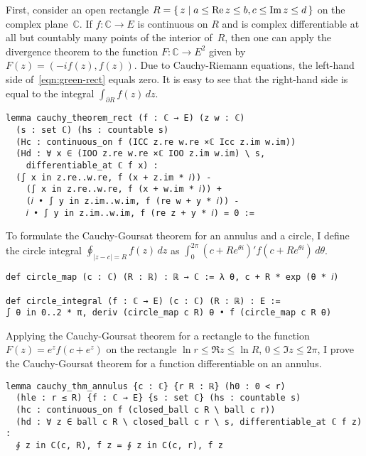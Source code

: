 \documentclass[a4paper, UKenglish,cleveref, autoref, thm-restate]{lipics-v2021}
\newcommand{\bbC}{\mathbb{C}}
\begin{document}
First, consider an open rectangle
\(R=\set{z|a\le \operatorname{Re}z\le b,c\le \operatorname{Im}z\le d}\) on the complex
plane~\(\bbC\). If \(f\colon \bbC\to E\) is continuous on \(R\) and is
complex differentiable at all but countably many points of the
interior of~\(R\), then one can apply the divergence theorem to the
function \(F\colon \bbC \to E^{2}\) given by \(F(z)=(-if(z),
f(z))\). Due to Cauchy-Riemann equations, the left-hand side
of~\eqref{eqn:green-rect} equals zero. It is easy to see that the
right-hand side is equal to the integral
\(\int_{\partial R}f(z)\,dz\).

\begin{lstlisting}[caption={The Cauchy-Goursat theorem for a rectangle},label=lst:cauchy-rect]
lemma cauchy_theorem_rect (f : ℂ → E) (z w : ℂ)
  (s : set ℂ) (hs : countable s)
  (Hc : continuous_on f (ICC z.re w.re ×ℂ Icc z.im w.im))
  (Hd : ∀ x ∈ (IOO z.re w.re ×ℂ IOO z.im w.im) \ s,
    differentiable_at ℂ f x) :
  (∫ x in z.re..w.re, f (x + z.im * 𝑖)) -
    (∫ x in z.re..w.re, f (x + w.im * 𝑖)) +
    (𝑖 • ∫ y in z.im..w.im, f (re w + y * 𝑖)) -
    𝑖 • ∫ y in z.im..w.im, f (re z + y * 𝑖) = 0 :=
\end{lstlisting}

To formulate the Cauchy-Goursat theorem for an annulus and a circle, I
define the circle integral \(\oint_{|z-c|=R}f(z)\,dz\) as
\(\int_{0}^{2\pi}(c+Re^{\theta i})'f(c+Re^{\theta i})\,d\theta\).

\begin{lstlisting}[caption=Definition of the circle integral \(\oint_{|z-c|=R}f(z)\,dz\)]
def circle_map (c : ℂ) (R : ℝ) : ℝ → ℂ := λ θ, c + R * exp (θ * 𝑖)

def circle_integral (f : ℂ → E) (c : ℂ) (R : ℝ) : E :=
∫ θ in 0..2 * π, deriv (circle_map c R) θ • f (circle_map c R θ)
\end{lstlisting}

Applying the Cauchy-Goursat theorem for a rectangle to the function
\(F(z)=e^{z}f(c+e^{z})\) on the rectangle \(\ln r\le \Re z\le \ln R\),
\(0\le \Im z\le 2\pi\), I prove the Cauchy-Goursat theorem for a
function differentiable on an annulus.

\begin{lstlisting}[caption=The Cauchy-Goursat theorem for an annulus,label=lst:cauchy-annulus]
lemma cauchy_thm_annulus {c : ℂ} {r R : ℝ} (h0 : 0 < r)
  (hle : r ≤ R) {f : ℂ → E} {s : set ℂ} (hs : countable s)
  (hc : continuous_on f (closed_ball c R \ ball c r))
  (hd : ∀ z ∈ ball c R \ closed_ball c r \ s, differentiable_at ℂ f z) :
  ∮ z in C(c, R), f z = ∮ z in C(c, r), f z
\end{lstlisting}
\end{document}
